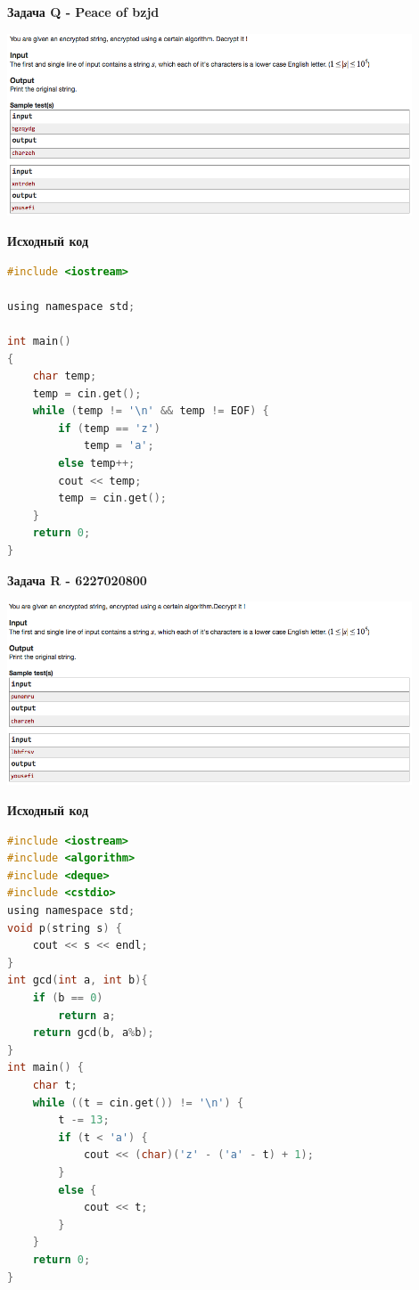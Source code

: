 \documentclass[a4paper,12pt]{article}
\begin{document}
\newpage
\textbf{{\large Задача Q - Peace of bzjd}} \\
\begin{center}
\includegraphics[width=0.9\textwidth]{CT_Crypto/CT_Crypto_Q.png}\\ [1cm]
\end{center}

\textbf{{\large Исходный код}}
\begin{lstlisting}[language=C]
#include <iostream>

using namespace std;

int main()
{
    char temp;
    temp = cin.get();
    while (temp != '\n' && temp != EOF) {
        if (temp == 'z') 
            temp = 'a';
        else temp++;
        cout << temp;
        temp = cin.get();
    }
    return 0;
}
\end{lstlisting}

\newpage
\textbf{{\large Задача R - 6227020800}} \\
\begin{center}
\includegraphics[width=0.9\textwidth]{CT_Crypto/CT_Crypto_R.png}\\ [1cm]
\end{center}

\textbf{{\large Исходный код}}
\begin{lstlisting}[language=C]
#include <iostream>
#include <algorithm>
#include <deque>
#include <cstdio>
using namespace std;
void p(string s) {
	cout << s << endl;
}
int gcd(int a, int b){
    if (b == 0)
        return a;
    return gcd(b, a%b);
}
int main() {
	char t;
	while ((t = cin.get()) != '\n') {
		t -= 13;
		if (t < 'a') {
			cout << (char)('z' - ('a' - t) + 1);
		}
		else {
			cout << t;
		}
	}
	return 0;
}
\end{lstlisting}
\end{document}
